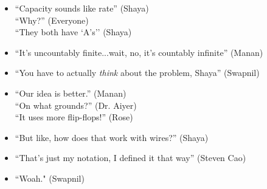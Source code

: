 \documentclass[11pt]{article}
\theoremstyle{definition}
\begin{document}
\begin{itemize}
\item ``Capacity sounds like rate'' (Shaya) \\ ``Why?'' (Everyone) \\ ``They both have `A's'' (Shaya)
\item ``It's uncountably finite...wait, no, it's countably infinite'' (Manan)
\item ``You have to actually \textit{think} about the problem, Shaya'' (Swapnil)
\item ``Our idea is better.'' (Manan) \\ ``On what grounds?'' (Dr. Aiyer) \\ ``It uses more flip-flops!'' (Rose)
\item ``But like, how does that work with wires?'' (Shaya)
\item ``That's just my notation, I defined it that way'' (Steven Cao)
\item ``Woah." (Swapnil)
\end{itemize}
\end{document}
